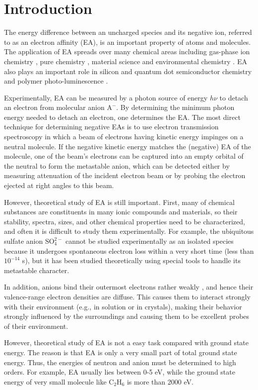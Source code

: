 \chapter{Introduction}
The energy difference between an uncharged species and its negative ion, referred to as an electron affinity (EA), is an important property of atoms and molecules. \cite{oldpaper}
The application of EA spreads over many chemical areas including gas-phase ion chemistry \cite{gasion}, pure chemistry \cite{pure}, material science and environmental chemistry \cite{environment}. EA also plays an important role in silicon \cite{silicon} and quantum dot \cite{quantumdot} semiconductor chemistry and polymer photo-luminescence \cite{luminescence}.

Experimentally, EA can be measured by a photon source of energy $h\nu$ to detach an electron from molecular anion $\text{A}^{-}$.
By determining the minimum photon energy needed to detach an electron, one determines the EA.
The most direct technique for determining negative EAs is to use electron transmission spectroscopy in which a beam of electrons having kinetic energy impinges on a neutral molecule.
If the negative kinetic energy matches the (negative) EA of the molecule, one of the beam’s electrons can be captured into an empty orbital of the neutral to form the metastable anion, which can be detected either by measuring attenuation of the incident electron beam or by probing the electron ejected at right
angles to this beam.

However, theoretical study of EA is still important.
First, many of chemical substances are constituents in many ionic compounds and materials, so their stability, spectra, sizes, and other chemical properties need to be characterized, and often it is difficult to study them experimentally.
For example, the ubiquitous sulfate anion $\text{SO}_4^{2-}$ cannot be studied experimentally as an isolated species because it undergoes spontaneous electron loss within a very short time (less than $10^{-14}$ s), but it has been studied theoretically \cite{SO4} using special tools to handle its metastable character.

In addition, anions bind their outermost electrons rather weakly , and hence their valence-range electron densities are diffuse.
This causes them to interact strongly with their environment (e.g., in solution or in crystals), making their behavior strongly influenced by the surroundings and causing them to be excellent probes of their environment.

However, theoretical study of EA is not a easy task compared with ground state energy.
The reason is that EA is only a very small part of total ground state energy.
Thus, the energies of neutron and anion must be determined to high orders.
For example, EA usually lies between 0-5 eV, while the ground state energy of very small molecule like $\text{C}_2\text{H}_6$ is more than 2000 eV.

